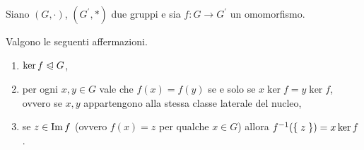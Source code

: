 \begin{proposition}
    \label{prop:rel_kernel_sgr_normali}
    Siano $(G, \cdot)$, $(G^\prime, *)$ due gruppi e sia $f : G \to G^\prime$ un omomorfismo. 
    
    Valgono le seguenti affermazioni.
    \begin{enumerate}[label={(\roman*)}]
        \item $\ker f \trianglelefteqslant G$,
        \item per ogni $x, y \in G$ vale che $f(x) = f(y)$ se e solo se $x\ker f = y\ker f$, ovvero se $x, y$ appartengono alla stessa classe laterale del nucleo,
        \item se $z \in \operatorname{Im} f$ (ovvero $f(x) = z$ per qualche $x \in G$) allora $f^{-1}(\left\{\;z\;\right\}) = x\ker f$.
    \end{enumerate}
\end{proposition}
